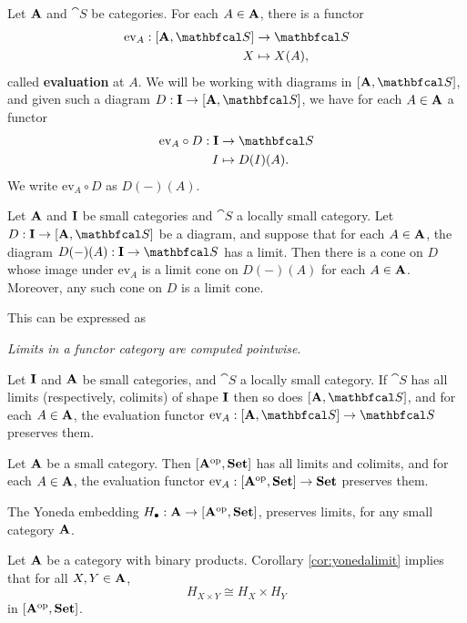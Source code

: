 \begin{notation}
    Let $\mathbf{A}$ and $\cat{S}$ be categories. For each $A\in\mathbf{A}$, there is a functor
    \begin{align*}
        \text{ev}_A: [\bcat{A},\cat{S}] &\to \cat{S}\\
        X &\mapsto X(A),
    \end{align*}
    called \textbf{evaluation} at $A$. We will be working with diagrams in $[\bcat{A},\cat{S}]$, and given such a diagram $D:\bcat{I}\to[\bcat{A},\cat{S}]$, we have for each $A\in\mathbf{A}$ a functor
    \begin{align*}
        \text{ev}_A\circ D: \bcat{I} &\to \cat{S}\\
        I &\mapsto D(I)(A).
    \end{align*}
    We write $\text{ev}_A\circ D$ as $D(-)(A)$.
\end{notation}

\begin{theorem}
    Let $\mathbf{A}$ and $\mathbf{I}$ be small categories and $\cat{S}$ a locally small category. Let $D:\bcat{I}\to[\bcat{A},\cat{S}]$ be a diagram, and suppose that for each $A\in\mathbf{A}$, the diagram $D(-)(A):\bcat{I}\to\cat{S}$ has a limit. Then there is a cone on $D$ whose image under $\text{ev}_A$ is a limit cone on $D(-)(A)$ for each $A\in\mathbf{A}$. Moreover, any such cone on $D$ is a limit cone.
\end{theorem}
This can be expressed as
\begin{center}
    \textit{Limits in a functor category are computed pointwise}.
\end{center}

\begin{corollary}
    Let $\mathbf{I}$ and $\mathbf{A}$ be small categories, and $\cat{S}$ a locally small category. If $\cat{S}$ has all limits (respectively, colimits) of shape $\mathbf{I}$ then so does $[\bcat{A},\cat{S}]$, and for each $A\in\mathbf{A}$, the evaluation functor $\text{ev}_A:[\bcat{A},\cat{S}]\to\cat{S}$ preserves them.
\end{corollary}

\begin{corollary}
    Let $\mathbf{A}$ be a small category. Then $[\mathbf{A}^\text{op}, \mathbf{Set}]$ has all limits and colimits, and for each $A\in\mathbf{A}$, the evaluation functor $\text{ev}_A:[\mathbf{A}^\text{op},\mathbf{Set}]\to\mathbf{Set}$ preserves them.
\end{corollary}

\begin{corollary}\label{cor:yonedalimit}
    The Yoneda embedding $H_{\bullet}:\mathbf{A}\to[\mathbf{A}^\text{op},\mathbf{Set}]$, preserves limits, for any small category $\mathbf{A}$.
\end{corollary}

\begin{example}
    Let $\mathbf{A}$ be a category with binary products. Corollary \ref{cor:yonedalimit} implies that for all $X,Y\in\mathbf{A}$,
    \begin{equation*}
        H_{X\times Y}\cong H_X\times H_Y
    \end{equation*}
    in $[\mathbf{A}^\text{op},\mathbf{Set}]$.
\end{example}
